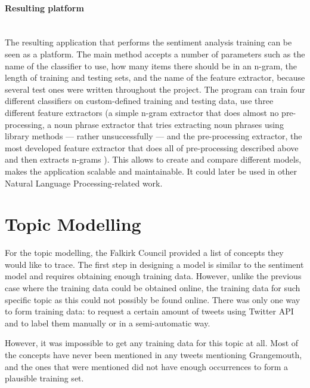 \paragraph{Resulting platform}\mbox{}\\
The resulting application that performs the sentiment analysis training can be seen as a platform. The main method accepts a number of parameters such as the name of the classifier to use, how many items there should be in an n-gram, the length of training and testing sets, and the name of the feature extractor, because several test ones were written throughout the project. The program can train four different classifiers on custom-defined training and testing data, use three different feature extractors (a simple n-gram extractor that does almost no pre-processing, a noun phrase extractor that tries extracting noun phrases using library methods --- rather unsuccessfully --- and the pre-processing extractor, the most developed feature extractor that does all of pre-processing described above and then extracts n-grams ). This allows to create and compare different models, makes the application scalable and maintainable. It could later be used in other Natural Language Processing-related work.

\section{Topic Modelling}
\label{sec:tm}

For the topic modelling, the Falkirk Council provided a list of concepts they would like to trace. The first step in designing a model is similar to the sentiment model and requires obtaining enough training data. However, unlike the previous case where the training data could be obtained online, the training data for such specific topic as this could not possibly be found online. There was only one way to form training data: to request a certain amount of tweets using Twitter API and to label them manually or in a semi-automatic way. 

However, it was impossible to get any training data for this topic at all. Most of the concepts have never been mentioned in any tweets mentioning Grangemouth, and the ones that were mentioned did not have enough occurrences to form a plausible training set. 

